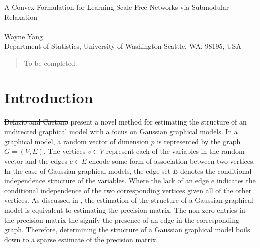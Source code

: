 \documentclass{uwstat572}
\newcommand{\vmdel}[1]{\sout{#1}}
\newcommand{\vmadd}[1]{\textbf{\color{red}{#1}}}
\begin{document}

\begin{center}
  {\LARGE A Convex Formulation for Learning Scale-Free Networks via Submodular Relaxation}\\\ \\
  {Wayne Yang \\ 
    Department of Statistics, University of Washington Seattle, WA, 98195, USA
  }
\end{center}



\begin{abstract}
  To be completed.
\end{abstract}

\section{Introduction}
\vmadd{\citet{Defazio2012}} \vmdel{Defazio and Caetano} present a novel method for estimating the structure of an undirected graphical model with a focus on Gaussian graphical models. In a graphical model, a random vector of dimension $p$ is represented by the graph $G = (V,E)$.  The vertices $v \in V$ represent each of the variables in the random vector and the edges $e \in E$ encode some form of association between two vertices. In the case of Gaussian graphical models, the edge set $E$ denotes the conditional independence structure of the variables.  Where the lack of an edge $e$ indicates the conditional independence of the two corresponding vertices given all of the other vertices.  As discussed in \cite{dempster}, the estimation of the structure of a Gaussian graphical model is equivalent to estimating the precision matrix.  The non-zero entries in the precision matrix \vmdel{the}  signify the presence of an edge in the corresponding graph.  Therefore, determining the structure of a Gaussian graphical model boils down to a sparse estimate of the precision matrix.
\end{document}
